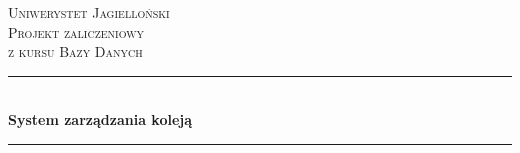 \begin{titlepage}

\newcommand{\HRule}{\rule{\linewidth}{0.5mm}} %

\center %
 

\textsc{\LARGE Uniwerystet Jagielloński}\\[1.5cm] %
\textsc{\Large Projekt zaliczeniowy}\\[0.5cm] %
\textsc{\large z kursu Bazy Danych}\\[0.5cm] %


\HRule \\[0.4cm]
{ \huge \bfseries System zarządzania koleją}\\[0.4cm] %
\HRule \\[1.5cm]
 



\end{titlepage}
